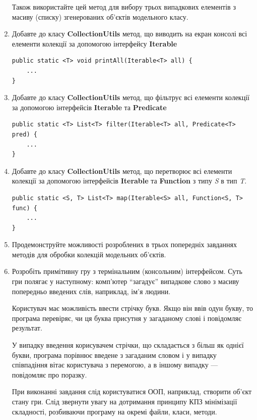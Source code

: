 \begin{enumerate}
Також використайте цей метод для вибору трьох випадкових елементів 
з масиву (списку) згенерованих об’єктів модельного класу.      
\item Добавте до класу {\bf CollectionUtils} метод, що виводить на 
екран консолі всі елементи колекції за допомогою інтерфейсу {\bf Iterable}
\begin{lstlisting}
public static <T> void printAll(Iterable<T> all) {
    ...
}
\end{lstlisting}
\item Добавте до класу {\bf CollectionUtils} метод, що фільтрує 
всі елементи колекції за допомогою інтерфейсів 
{\bf Iterable} та {\bf Predicate} 
\begin{lstlisting}
public static <T> List<T> filter(Iterable<T> all, Predicate<T> pred) {
    ...
}
\end{lstlisting}
\item Добавте до класу {\bf CollectionUtils} метод, що перетворює 
всі елементи колекції за допомогою інтерфейсів 
{\bf Iterable} та {\bf Function} з типу {\it S} в тип {\it T}. 
\begin{lstlisting}
public static <S, T> List<T> map(Iterable<S> all, Function<S, T> func) {
    ...
}
\end{lstlisting}
\item Продемонструйте можливості розроблених в трьох попередніх 
завданнях методів для обробки колекцій модельних об’єктів.
\item Розробіть примітивну гру з термінальним (консольним) інтерфейсом. 
Суть гри полягає у наступному: комп’ютер ``загадує'' випадкове слово з масиву попередньо введених слів, наприклад, ім’я людини. 

Користувач має можливість ввести стрічку букв.
Якщо він ввів одун букву, то програма перевіряє, чи ця буква присутня у загаданому слові і повідомляє результат.
 
У випадку введення корисувачем стрічки, що складається з більш як однієї букви, програма порівнює введене з загаданим словом і у випадку співпадіння вітає користувача з перемогою, а в іншому випадку --- повідомляє про поразку.

При виконанні завдання слід користуватися ООП, наприклад, створити об’єкт стану гри. Слід звернути увагу на дотримання принципу КПЗ мінімізації складності, розбиваючи програму на окремі файли, класи, методи.      
\end{enumerate}

